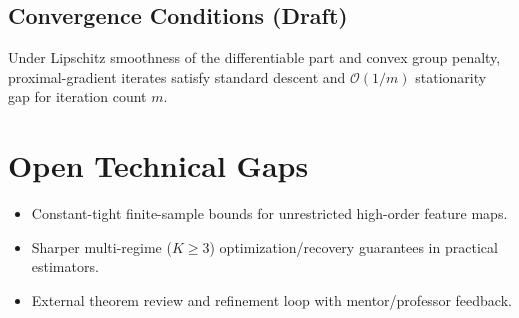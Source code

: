\documentclass[11pt]{article}
\begin{document}
\subsection{Convergence Conditions (Draft)}
Under Lipschitz smoothness of the differentiable part and convex group penalty,
proximal-gradient iterates satisfy standard descent and
$\mathcal{O}(1/m)$ stationarity gap for iteration count $m$.

\section{Open Technical Gaps}
\begin{itemize}
    \item Constant-tight finite-sample bounds for unrestricted high-order feature maps.
    \item Sharper multi-regime ($K\ge 3$) optimization/recovery guarantees in practical estimators.
    \item External theorem review and refinement loop with mentor/professor feedback.
\end{itemize}
\end{document}

